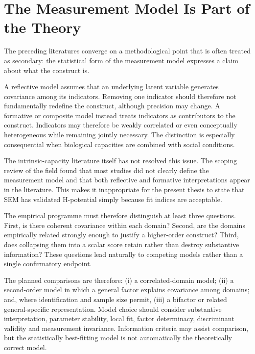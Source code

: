 \section{The Measurement Model Is Part of the Theory}

The preceding literatures converge on a methodological point that is often treated as secondary: the statistical form of the measurement model expresses a claim about what the construct is.

A reflective model assumes that an underlying latent variable generates covariance among its indicators. Removing one indicator should therefore not fundamentally redefine the construct, although precision may change. A formative or composite model instead treats indicators as contributors to the construct. Indicators may therefore be weakly correlated or even conceptually heterogeneous while remaining jointly necessary. The distinction is especially consequential when biological capacities are combined with social conditions.

The intrinsic-capacity literature itself has not resolved this issue. The scoping review of the field found that most studies did not clearly define the measurement model and that both reflective and formative interpretations appear in the literature. \cite{who_intrinsic_capacity_2017,beard_intrinsic_2019} This makes it inappropriate for the present thesis to state that SEM has validated H-potential simply because fit indices are acceptable.

The empirical programme must therefore distinguish at least three questions. First, is there coherent covariance within each domain? Second, are the domains empirically related strongly enough to justify a higher-order construct? Third, does collapsing them into a scalar score retain rather than destroy substantive information? These questions lead naturally to competing models rather than a single confirmatory endpoint.

The planned comparisons are therefore: (i) a correlated-domain model; (ii) a second-order model in which a general factor explains covariance among domains; and, where identification and sample size permit, (iii) a bifactor or related general-specific representation. Model choice should consider substantive interpretation, parameter stability, local fit, factor determinacy, discriminant validity and measurement invariance. Information criteria may assist comparison, but the statistically best-fitting model is not automatically the theoretically correct model.

